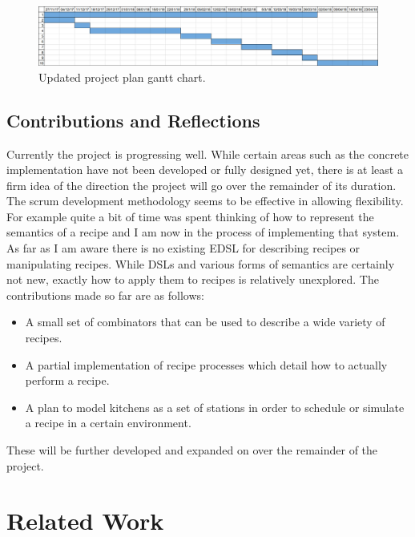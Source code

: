 \documentclass[11pt]{article}
\begin{document}
    \begin{figure}[ht]
        \centering
            \includegraphics[width=\textwidth,keepaspectratio]{gantt_chart2.jpg}
        \caption{Updated project plan gantt chart.}
    \end{figure}

    \subsection{Contributions and Reflections}

    Currently the project is progressing well. While certain areas such as the concrete implementation have
    not been developed or fully designed yet, there is at least a firm idea of the direction the project will go
    over the remainder of its duration. The scrum development methodology seems to be effective in allowing
    flexibility. For example quite a bit of time was spent thinking of how to represent the semantics of a
    recipe and I am now in the process of implementing that system. \\
    
    As far as I am aware there is no existing EDSL for describing recipes or manipulating recipes. While DSLs
    and various forms of semantics are certainly not new, exactly how to apply them to recipes is relatively
    unexplored. The contributions made so far are as follows:

    \begin{itemize}
        \item A small set of combinators that can be used to describe a wide variety of recipes.

        \item A partial implementation of recipe processes which detail how to actually perform a recipe.

        \item A plan to model kitchens as a set of stations in order to schedule or simulate a recipe
        in a certain environment.
    \end{itemize}

    These will be further developed and expanded on over the remainder of the project.

    \section{Related Work}
\end{document}
